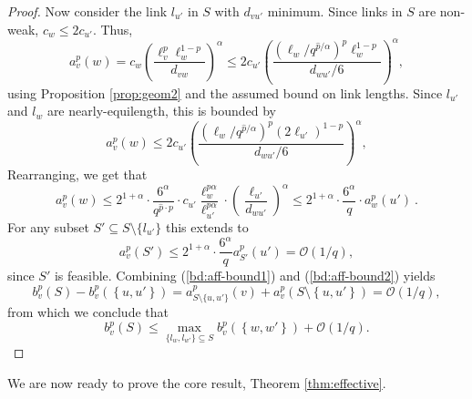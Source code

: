 \documentclass[11pt]{amsart}
\newcommand{\BO}{\mathcal{O}}
\begin{document}
\begin{proof}
Now consider the link $l_{u'}$ in $S$ with $d_{vu'}$ minimum. 
Since links in $S$ are non-weak, $c_w \le 2 c_{u'}$.
Thus,
\[ a_v^p(w) = c_w \left(\frac{\ell_v^p \ell_w^{1-p}}{d_{vw}}\right)^\alpha
 \le  2 c_{u'} \left(\frac{(\ell_w/q^{\hat{p}/\alpha})^p \ell_w^{1-p}}{d_{wu'}/6}\right)^\alpha, \]
using Proposition \ref{prop:geom2} and the assumed bound on link lengths.
 Since $l_{u'}$ and $l_w$ are nearly-equilength, this is bounded by
\[ a_v^p(w) \le  2 c_{u'} \left(\frac{(\ell_w/q^{\hat{p}/\alpha})^p (2\ell_{u'})^{1-p}}{d_{wu'}/6}\right)^\alpha, \]
Rearranging, we get that
\[ a_v^p(w) \le  2^{1+\alpha}\cdot \frac{6^{\alpha}}{q^{\hat{p} \cdot p}} 
  \cdot c_{u'}\frac{\ell_w^{p\alpha}}{\ell_{u'}^{p\alpha}}\cdot \left( \frac{\ell_{u'}}{d_{wu'}}\right)^\alpha
  \le  2^{1+\alpha} \cdot \frac{6^{\alpha}}{q}\cdot a_w^p\left(u'\right)\ . 
\]
For any subset $S'\subseteq S\setminus \{l_{u'}\}$ this extends to 
\begin{equation}
a_{v}^p\left(S'\right)\leq  2^{1+\alpha} \cdot\frac{6^{\alpha}}{q}  a_{S'}^p\left(u'\right)=\BO(1/q),\label{bd:aff-bound2}
\end{equation}
since $S'$ is feasible. 
Combining (\ref{bd:aff-bound1}) and (\ref{bd:aff-bound2}) yields
\[ b^p_v(S) - b^p_v\left(\left\{u,u'\right\}\right) 
= a_{S\setminus \{u,u'\}}^p(v) + a_v^p\left(S\setminus \left\{u,u'\right\}\right) = \BO(1/q), \]
from which we conclude that 
\[b^p_v(S) \le \max_{\{l_w,l_{w'}\} \subseteq S} b^p_v\left(\left\{w,w'\right\}\right) + \BO(1/q).\]
\end{proof}








We are now ready to prove the core result, Theorem \ref{thm:effective}.

\smallskip
\end{document}
